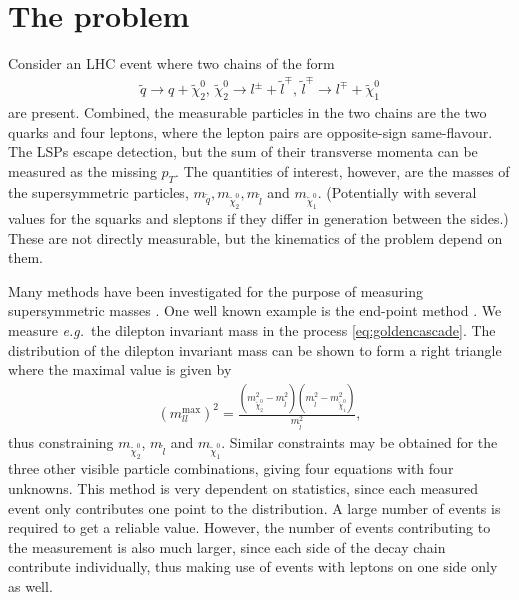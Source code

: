 \documentclass[twoside,english]{uiofysmaster}
\begin{document}
\section{The problem}
Consider an LHC event where two chains of the form
\begin{align}
	\tilde{q} \to q + \tilde{\chi}_2^0, \, \tilde{\chi}_2^0 \to l^{\pm} + \tilde{l}^\mp, \, \tilde{l}^\mp \to l^\mp + \tilde{\chi}_1^0\label{eq:goldencascade}
\end{align}
are present. Combined, the measurable particles in the two chains are the two quarks and four leptons, where the lepton pairs are opposite-sign same-flavour. The LSPs escape detection, but the sum of their transverse momenta can be measured as the missing $p_T$. The quantities of interest, however, are the masses of the supersymmetric particles, $m_{\tilde{q}}, m_{\tilde{\chi}_2^0}, m_{\tilde{l}}$ and $m_{\tilde{\chi}_1^0}$. (Potentially with several values for the squarks and sleptons if they differ in generation between the sides.) These are not directly measurable, but the kinematics of the problem depend on them. 

Many methods have been investigated for the purpose of measuring supersymmetric masses \cite{Barr:2010zj}. One well known example is the end-point method \cite{1126-6708-2000-09-004}. We measure {\it e.g.}\ the dilepton invariant mass in the process \eqref{eq:goldencascade}. The distribution of the dilepton invariant mass can be shown to form a right triangle where the maximal value is given by
\begin{align}
	(m_{ll}^\mathrm{max})^2 = \frac{ \left( m^2_{\tilde{\chi}_2^0} - m^2_{\tilde{l}} \right) \left( m^2_{\tilde{l}} - m^2_{\tilde{\chi}_1^0} \right)}{m^2_{\tilde{l}}}, \label{eq:invariant_mass_endpoint}
\end{align}
thus constraining $m_{\tilde{\chi}_2^0}$, $m_{\tilde{l}}$ and $m_{\tilde{\chi}_1^0}$. Similar constraints may be obtained for the three other visible particle combinations, giving four equations with four unknowns. This method is very dependent on statistics, since each measured event only contributes one point to the distribution. A large number of events is required to get a reliable value. However, the number of events contributing to the measurement is also much larger, since each side of the decay chain contribute individually, thus making use of events with leptons on one side only as well.
\end{document}
